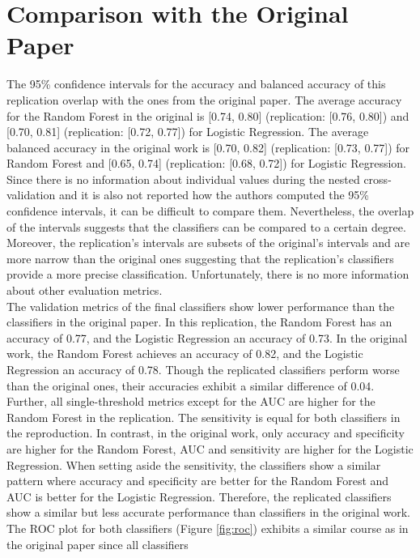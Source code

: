 \section{Comparison with the Original Paper}
The 95\% confidence intervals for the accuracy and balanced accuracy of this 
replication overlap with the ones from the original paper. The average accuracy 
for the Random Forest in the original is [0.74, 0.80] (replication: [0.76, 
0.80]) 
and [0.70, 0.81] (replication: [0.72, 0.77]) for Logistic Regression. The 
average balanced accuracy in the original work is [0.70, 0.82] (replication: 
[0.73, 0.77]) for Random Forest and [0.65, 0.74] (replication: [0.68, 0.72]) 
for Logistic Regression. Since there is no information about individual values 
during the nested cross-validation and it is also not reported how the authors 
computed the 95\% confidence intervals, it can be difficult to compare them. 
Nevertheless, the overlap of the intervals suggests that the classifiers can be 
compared to a certain degree. Moreover, the replication's intervals are subsets 
of the original's intervals and are more narrow than the original ones 
suggesting that the replication's classifiers provide a more precise 
classification.
Unfortunately, there is no more information about other evaluation 
metrics.
\\
The validation metrics of the final classifiers show lower performance than the 
classifiers in the original paper. In this replication, the Random Forest has an 
accuracy of 0.77, and the Logistic Regression an accuracy of 0.73. In the 
original work, the Random Forest achieves an accuracy of 0.82, and the Logistic 
Regression an accuracy of 0.78. Though the replicated classifiers perform worse 
than the original ones, their accuracies exhibit a similar difference of 0.04. 
Further, all single-threshold metrics except for the AUC are higher for the 
Random Forest in the replication. The sensitivity is equal for both classifiers 
in the reproduction.  In contrast, in the original work, only accuracy and 
specificity are higher for the Random Forest, AUC and sensitivity are higher for 
the Logistic Regression. When setting aside the sensitivity, the classifiers 
show a similar pattern where accuracy and specificity are better for the Random 
Forest and AUC is better for the Logistic Regression. Therefore, the replicated 
classifiers show a similar but less accurate performance than classifiers in the 
original work. The ROC plot for both classifiers (Figure \ref{fig:roc}) 
exhibits a similar course as in the original paper since all classifiers 
